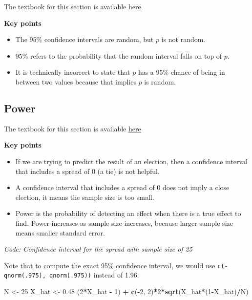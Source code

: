 \documentclass[
]{article}
\newenvironment{Shaded}{\begin{snugshade}}{\end{snugshade}}
\newcommand{\DecValTok}[1]{\textcolor[rgb]{0.00,0.00,0.81}{#1}}
\newcommand{\FloatTok}[1]{\textcolor[rgb]{0.00,0.00,0.81}{#1}}
\newcommand{\KeywordTok}[1]{\textcolor[rgb]{0.13,0.29,0.53}{\textbf{#1}}}
\newcommand{\NormalTok}[1]{#1}
\newcommand{\OperatorTok}[1]{\textcolor[rgb]{0.81,0.36,0.00}{\textbf{#1}}}
\newcommand{\StringTok}[1]{\textcolor[rgb]{0.31,0.60,0.02}{#1}}
\providecommand{\tightlist}{%
  \setlength{\itemsep}{0pt}\setlength{\parskip}{0pt}}
\begin{document}
The textbook for this section is available
\href{https://rafalab.github.io/dsbook/inference.html\#the-correct-language}{here}

\textbf{Key points}

\begin{itemize}
\tightlist
\item
  The 95\% confidence intervals are random, but \(p\) is not random.
\item
  95\% refers to the probability that the random interval falls on top
  of \(p\).
\item
  It is technically incorrect to state that \(p\) has a 95\% chance of
  being in between two values because that implies \(p\) is random.
\end{itemize}

\hypertarget{power}{%
\subsection{Power}\label{power}}

The textbook for this section is available
\href{https://rafalab.github.io/dsbook/inference.html\#power}{here}

\textbf{Key points}

\begin{itemize}
\tightlist
\item
  If we are trying to predict the result of an election, then a
  confidence interval that includes a spread of 0 (a tie) is not
  helpful.
\item
  A confidence interval that includes a spread of 0 does not imply a
  close election, it means the sample size is too small.
\item
  Power is the probability of detecting an effect when there is a true
  effect to find. Power increases as sample size increases, because
  larger sample size means smaller standard error.
\end{itemize}

\emph{Code: Confidence interval for the spread with sample size of 25}

Note that to compute the exact 95\% confidence interval, we would use
\texttt{c(-qnorm(.975),\ qnorm(.975))} instead of 1.96.

\begin{Shaded}
\begin{Highlighting}[]
\NormalTok{N \textless{}{-}}\StringTok{ }\DecValTok{25}
\NormalTok{X\_hat \textless{}{-}}\StringTok{ }\FloatTok{0.48}
\NormalTok{(}\DecValTok{2}\OperatorTok{*}\NormalTok{X\_hat }\OperatorTok{{-}}\StringTok{ }\DecValTok{1}\NormalTok{) }\OperatorTok{+}\StringTok{ }\KeywordTok{c}\NormalTok{(}\OperatorTok{{-}}\DecValTok{2}\NormalTok{, }\DecValTok{2}\NormalTok{)}\OperatorTok{*}\DecValTok{2}\OperatorTok{*}\KeywordTok{sqrt}\NormalTok{(X\_hat}\OperatorTok{*}\NormalTok{(}\DecValTok{1}\OperatorTok{{-}}\NormalTok{X\_hat)}\OperatorTok{/}\NormalTok{N)}
\end{Highlighting}
\end{Shaded}
\end{document}
